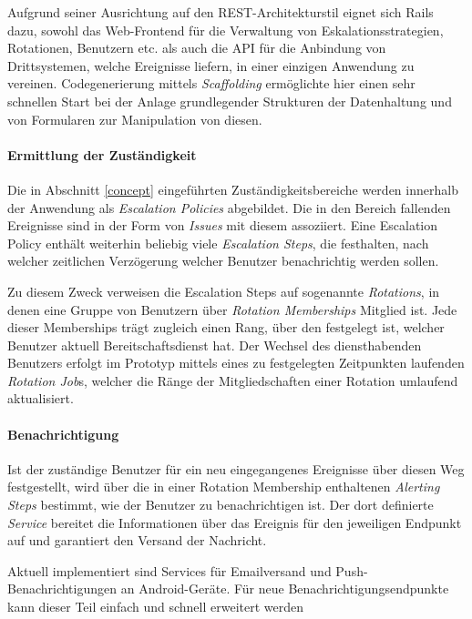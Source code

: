 \documentclass[11pt,utf8,notoc,bibnum,german,final]{zihpub}
\begin{document}
Aufgrund seiner Ausrichtung auf den REST-Architekturstil \cite{fielding-rest}
eignet sich Rails dazu, sowohl das Web-Frontend für die Verwaltung von
Eskalationsstrategien, Rotationen, Benutzern etc. als auch die API für die
Anbindung von Drittsystemen, welche Ereignisse liefern, in einer einzigen
Anwendung zu vereinen. Codegenerierung mittels \emph{Scaffolding} ermöglichte
hier einen sehr schnellen Start bei der Anlage grundlegender Strukturen der
Datenhaltung und von Formularen zur Manipulation von diesen.

\paragraph{Ermittlung der Zuständigkeit}

Die in Abschnitt \ref{concept} eingeführten Zuständigkeitsbereiche werden
innerhalb der Anwendung als \emph{Escalation Policies} abgebildet. Die in den
Bereich fallenden Ereignisse sind in der Form von \emph{Issues} mit diesem
assoziiert. Eine Escalation Policy enthält weiterhin beliebig viele
\emph{Escalation Steps}, die festhalten, nach welcher zeitlichen Verzögerung
welcher Benutzer benachrichtig werden sollen.

Zu diesem Zweck verweisen die Escalation Steps auf sogenannte \emph{Rotations},
in denen eine Gruppe von Benutzern über \emph{Rotation Memberships} Mitglied
ist. Jede dieser Memberships trägt zugleich einen Rang, über den festgelegt
ist, welcher Benutzer aktuell Bereitschaftsdienst hat. Der Wechsel des
diensthabenden Benutzers erfolgt im Prototyp mittels eines zu festgelegten
Zeitpunkten laufenden \emph{Rotation Job}s, welcher die Ränge der
Mitgliedschaften einer Rotation umlaufend aktualisiert.

\paragraph{Benachrichtigung}

Ist der zuständige Benutzer für ein neu eingegangenes Ereignisse über diesen
Weg festgestellt, wird über die in einer Rotation Membership enthaltenen
\emph{Alerting Steps} bestimmt, wie der Benutzer zu benachrichtigen ist. Der
dort definierte \emph{Service} bereitet die Informationen über das Ereignis für
den jeweiligen Endpunkt auf und garantiert den Versand der Nachricht.

Aktuell implementiert sind Services für Emailversand und
Push-Benachrichtigungen an Android-Geräte. Für neue Benachrichtigungsendpunkte
kann dieser Teil einfach und schnell erweitert werden
\end{document}
